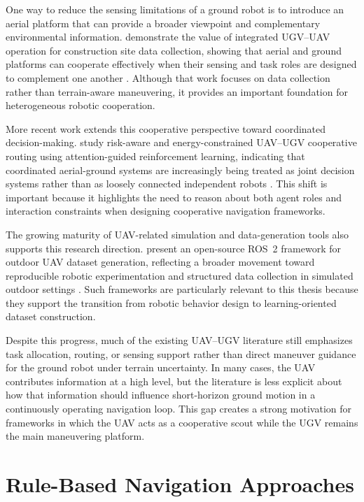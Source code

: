 One way to reduce the sensing limitations of a ground robot is to introduce an aerial platform that can provide a broader viewpoint and complementary environmental information. \citeauthor{asadi2020integrated} demonstrate the value of integrated UGV--UAV operation for construction site data collection, showing that aerial and ground platforms can cooperate effectively when their sensing and task roles are designed to complement one another \citep{asadi2020integrated}. Although that work focuses on data collection rather than terrain-aware maneuvering, it provides an important foundation for heterogeneous robotic cooperation.

More recent work extends this cooperative perspective toward coordinated decision-making. \citeauthor{mondal2025risk} study risk-aware and energy-constrained UAV--UGV cooperative routing using attention-guided reinforcement learning, indicating that coordinated aerial-ground systems are increasingly being treated as joint decision systems rather than as loosely connected independent robots \citep{mondal2025risk}. This shift is important because it highlights the need to reason about both agent roles and interaction constraints when designing cooperative navigation frameworks.

The growing maturity of UAV-related simulation and data-generation tools also supports this research direction. \citeauthor{jarraya2025osrfodg} present an open-source ROS~2 framework for outdoor UAV dataset generation, reflecting a broader movement toward reproducible robotic experimentation and structured data collection in simulated outdoor settings \citep{jarraya2025osrfodg}. Such frameworks are particularly relevant to this thesis because they support the transition from robotic behavior design to learning-oriented dataset construction.

Despite this progress, much of the existing UAV--UGV literature still emphasizes task allocation, routing, or sensing support rather than direct maneuver guidance for the ground robot under terrain uncertainty. In many cases, the UAV contributes information at a high level, but the literature is less explicit about how that information should influence short-horizon ground motion in a continuously operating navigation loop. This gap creates a strong motivation for frameworks in which the UAV acts as a cooperative scout while the UGV remains the main maneuvering platform.

\section{Rule-Based Navigation Approaches}

